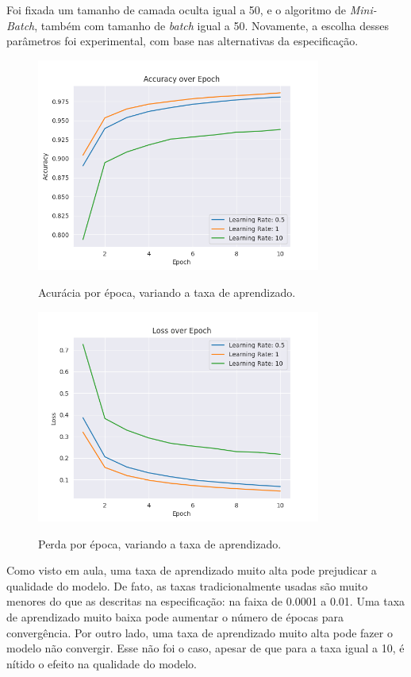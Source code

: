 \documentclass[a4paper]{article}
\begin{document}
Foi fixada um tamanho de camada oculta igual a 50, e o algoritmo de \textit{Mini-Batch}, também com tamanho de \textit{batch} igual a 50. Novamente, a escolha desses parâmetros foi experimental, com base nas alternativas da especificação.

\begin{figure}[H]
  \begin{center}
  {\includegraphics[height=7cm]{./images/Accuracy_over_Epoch_var_Rate.png}}
  \end{center}
  \caption{Acurácia por época, variando a taxa de aprendizado. \label{fig:aer}}
\end{figure}

\begin{figure}[H]
  \begin{center}
  {\includegraphics[height=7cm]{./images/Loss_over_Epoch_var_Rate.png}}
  \end{center}
  \caption{Perda por época, variando a taxa de aprendizado. \label{fig:ler}}
\end{figure}

Como visto em aula, uma taxa de aprendizado muito alta pode prejudicar a qualidade do modelo. De fato, as taxas tradicionalmente usadas são muito menores do que as descritas na especificação: na faixa de 0.0001 a 0.01. Uma taxa de aprendizado muito baixa pode aumentar o número de épocas para convergência. Por outro lado, uma taxa de aprendizado muito alta pode fazer o modelo não convergir. Esse não foi o caso, apesar de que para a taxa igual a 10, é nítido o efeito na qualidade do modelo.
\end{document}

